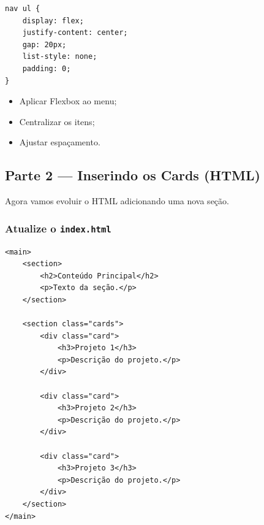 \documentclass[12pt,a4paper]{article}
\begin{document}
\begin{boxCodigo}
\begin{verbatim}
nav ul {
    display: flex;
    justify-content: center;
    gap: 20px;
    list-style: none;
    padding: 0;
}
\end{verbatim}
\end{boxCodigo}

\begin{boxAtividade}[Atividade 1]

\begin{itemize}
\item Aplicar Flexbox ao menu;
\item Centralizar os itens;
\item Ajustar espaçamento.
\end{itemize}

\end{boxAtividade}


\subsection{Parte 2 — Inserindo os Cards (HTML)}

Agora vamos evoluir o HTML adicionando uma nova seção.

\subsubsection{Atualize o \texttt{index.html}}

\begin{boxCodigo}
\begin{verbatim}
<main>
    <section>
        <h2>Conteúdo Principal</h2>
        <p>Texto da seção.</p>
    </section>

    <section class="cards">
        <div class="card">
            <h3>Projeto 1</h3>
            <p>Descrição do projeto.</p>
        </div>

        <div class="card">
            <h3>Projeto 2</h3>
            <p>Descrição do projeto.</p>
        </div>

        <div class="card">
            <h3>Projeto 3</h3>
            <p>Descrição do projeto.</p>
        </div>
    </section>
</main>
\end{verbatim}
\end{boxCodigo}
\end{document}
